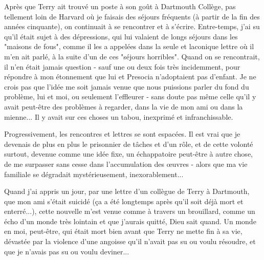 Après que Terry ait trouvé un poste à son goût à Dartmouth Collège, pas tellement loin de Harvard où je faisais des séjours fréquents (à partir de la fin des années cinquante), on continuait à se rencontrer et à s'écrire. Entre-temps, j'ai su qu'il était sujet à des dépressions, qui lui valaient de longs séjours dans les "maisons de fous", comme il les a appelées dans la seule et laconique lettre où il m'en ait parlé, à la suite d'un de ces "séjours horribles". Quand on se rencontrait, il n'en était jamais question - sauf une ou deux fois très incidemment, pour répondre à mon étonnement que lui et Presocia n'adoptaient pas d'enfant. Je ne crois pas que l'idée me soit jamais venue que nous puissions parler du fond du problème, lui et moi, ou seulement l'effleurer - sans doute pas même celle qu'il y avait peut-être des problèmes à regarder, dans la vie de mon ami ou dans la mienne... Il y avait sur ces choses un tabou, inexprimé et infranchissable.

Progressivement, les rencontres et lettres se sont espacées. Il est vrai que je devenais de plus en plus le prisonnier de tâches et d'un rôle, et de cette volonté surtout, devenue comme une idée fixe, un échappatoire peut-être à autre chose, de me surpasser sans cesse dans l'accumulation des œuvres - alors que ma vie familiale se dégradait mystérieusement, inexorablement...

Quand j'ai appris un jour, par une lettre d'un collègue de Terry à Dartmouth, que mon ami s'était suicidé (ça a été longtemps après qu'il soit déjà mort et enterré...), cette nouvelle m'est venue comme à travers un brouillard, comme un écho d'un monde très lointain et que j'aurais quitté, Dieu sait quand. Un monde en moi, peut-être, qui était mort bien avant que Terry ne mette fin à sa vie, dévastée par la violence d'une angoisse qu'il n'avait pas su ou voulu résoudre, et que je n'avais pas su ou voulu deviner...